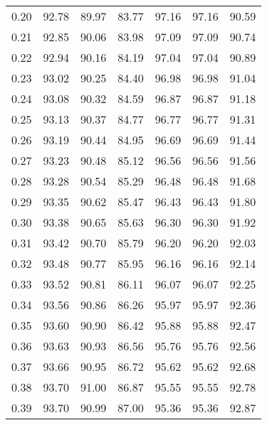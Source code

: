 \begin{tabular}{|c|c|c|c|c|c|c|}
      0.20 &     92.78 &     89.97 &      83.77 &   97.16 &      97.16 &         90.59 \\
      0.21 &     92.85 &     90.06 &      83.98 &   97.09 &      97.09 &         90.74 \\
      0.22 &     92.94 &     90.16 &      84.19 &   97.04 &      97.04 &         90.89 \\
      0.23 &     93.02 &     90.25 &      84.40 &   96.98 &      96.98 &         91.04 \\
      0.24 &     93.08 &     90.32 &      84.59 &   96.87 &      96.87 &         91.18 \\
      0.25 &     93.13 &     90.37 &      84.77 &   96.77 &      96.77 &         91.31 \\
      0.26 &     93.19 &     90.44 &      84.95 &   96.69 &      96.69 &         91.44 \\
      0.27 &     93.23 &     90.48 &      85.12 &   96.56 &      96.56 &         91.56 \\
      0.28 &     93.28 &     90.54 &      85.29 &   96.48 &      96.48 &         91.68 \\
      0.29 &     93.35 &     90.62 &      85.47 &   96.43 &      96.43 &         91.80 \\
      0.30 &     93.38 &     90.65 &      85.63 &   96.30 &      96.30 &         91.92 \\
      0.31 &     93.42 &     90.70 &      85.79 &   96.20 &      96.20 &         92.03 \\
      0.32 &     93.48 &     90.77 &      85.95 &   96.16 &      96.16 &         92.14 \\
      0.33 &     93.52 &     90.81 &      86.11 &   96.07 &      96.07 &         92.25 \\
      0.34 &     93.56 &     90.86 &      86.26 &   95.97 &      95.97 &         92.36 \\
      0.35 &     93.60 &     90.90 &      86.42 &   95.88 &      95.88 &         92.47 \\
      0.36 &     93.63 &     90.93 &      86.56 &   95.76 &      95.76 &         92.56 \\
      0.37 &     93.66 &     90.95 &      86.72 &   95.62 &      95.62 &         92.68 \\
      0.38 &     93.70 &     91.00 &      86.87 &   95.55 &      95.55 &         92.78 \\
      0.39 &     93.70 &     90.99 &      87.00 &   95.36 &      95.36 &         92.87 \\

\end{tabular}
